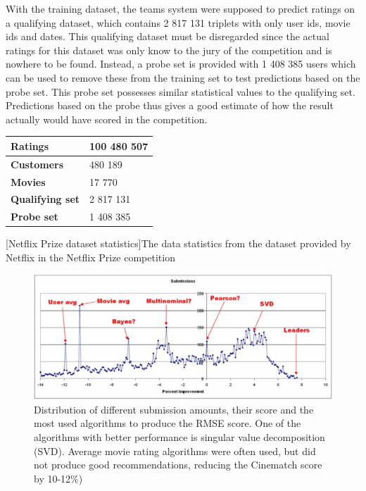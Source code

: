 With the training dataset, the teams system were supposed to predict ratings on a qualifying dataset, which contains 2 817 131 triplets with only user ids, movie ids and dates. This qualifying dataset must be disregarded since the actual ratings for this dataset was only know to the jury of the competition and is nowhere to be found. Instead, a probe set is provided with 1 408 385 users which can be used to remove these from the training set to test predictions based on the probe set. This probe set possesses similar statistical values to the qualifying set. Predictions based on the probe thus gives a good estimate of how the result actually would have scored in the competition\cite{nfprizeset}.

\begin{table}[H]
\centering
\begin{tabular}{ l l }
\hline
\textbf{Ratings} & 100 480 507 \\ \hline
\textbf{Customers} & 480 189 \\ \hline
\textbf{Movies} & 17 770 \\ \hline
\textbf{Qualifying set} & 2 817 131 \\ \hline
\textbf{Probe set} & 1 408 385 \\ \hline
\end{tabular}
[Netflix Prize dataset statistics]{The data statistics from the dataset provided by Netflix in the Netflix Prize competition}\label{tab:nfDatasetStat}
\end{table}

\begin{figure}[H]
\includegraphics[width=5in]{image/sub-distr-nf.png}
\centering
\caption[Distribution of different submission]{Distribution of different submission amounts, their score and the most used algorithms to produce the RMSE score. One of the algorithms with better performance is singular value decomposition (SVD). Average movie rating algorithms were often used, but did not produce good recommendations, reducing the Cinematch score by 10-12\%)}
\label{figure:sub-distr-nf}
\end{figure}

